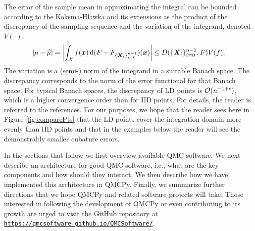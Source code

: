 \documentclass[graybox,footinfo]{svmult}
\newcommand{\QMCPYabs}[1]{\ensuremath{{\left \lvert #1 \right \rvert}}}
\newcommand{\hmu}{\widehat{\mu}}
\begin{document}
The error of the sample mean in approximating the integral can be bounded according to the Koksma-Hlawka and its extensions as the product of the discrepancy of the sampling sequence and the variation of the integrand, denoted $V(\cdot)$:
\begin{equation}
	\QMCPYabs{\mu - \hmu} = \QMCPYabs{\int_{\calX} f(\bsx) \, \D (F - F_{\{\bsX_i\}_{i=0}^{n-1}}) (\bsx)} \le D(\{\bsX_i\}_{i=0}^{n-1}, F) V(f),
\end{equation} 
The variation is a (semi-) norm of the integrand in a suitable Banach space.  The discrepancy corresponds to the norm of the error functional for that Banach space.  For typical Banach spaces, the discrepancy of LD points is ${\mathcal{O}}(n^{-1+\epsilon})$, which is a higher convergence order than for IID points.  For details, the reader is referred to the references.  For our purposes, we hope  that the reader sees here in Figure \ref{fig:comparePts} that the LD points cover the integration domain more evenly than IID points and that in the examples below the reader will see the demonstrably smaller cubature errors.

In the sections that follow we first overview available QMC software.  We next describe an architecture for good QMC software, i.e., what are the key components and how should they interact.  We then describe how we have implemented this architecture in QMCPy.  Finally, we summarize further directions that we hope QMCPy and related software projects will take.  Those interested in following the development of QMCPy or even contributing to its growth are urged to visit the GitHub repository at \href{https://qmcsoftware.github.io/QMCSoftware/}{\nolinkurl{https://qmcsoftware.github.io/QMCSoftware/}}.
\end{document}
